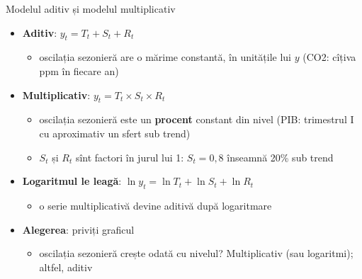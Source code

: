 \begin{frame}{Modelul aditiv și modelul multiplicativ}
\itemsize{\small}
\begin{itemize}
    \item \textbf{Aditiv}: $y_t = T_t + S_t + R_t$
    \begin{itemize}
        \item oscilația sezonieră are o mărime constantă, în unitățile lui $y$ (CO2: cîțiva ppm în fiecare an)
    \end{itemize}
    \item \textbf{Multiplicativ}: $y_t = T_t \times S_t \times R_t$
    \begin{itemize}
        \item oscilația sezonieră este un \textbf{procent} constant din nivel (PIB: trimestrul I cu aproximativ un sfert sub trend)
        \item $S_t$ și $R_t$ sînt factori în jurul lui 1: $S_t = 0{,}8$ înseamnă 20\% sub trend
    \end{itemize}
    \item \textbf{Logaritmul le leagă}: $\ln y_t = \ln T_t + \ln S_t + \ln R_t$
    \begin{itemize}
        \item o serie multiplicativă devine aditivă după logaritmare
    \end{itemize}
    \item \textbf{Alegerea}: priviți graficul
    \begin{itemize}
        \item oscilația sezonieră crește odată cu nivelul? Multiplicativ (sau logaritmi); altfel, aditiv
    \end{itemize}
\end{itemize}
\end{frame}

